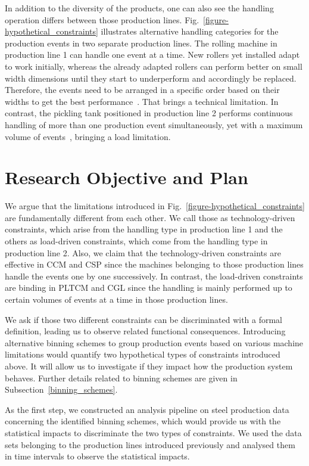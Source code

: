 In addition to the diversity of the products, one can also see the handling operation differs between those production lines. Fig.~\ref{figure-hypothetical_constraints} illustrates alternative handling categories for the production events in two separate production lines. The rolling machine in production line 1 can handle one event at a time. New rollers yet installed adapt to work initially, whereas the already adapted rollers can perform better on small width dimensions until they start to underperform and accordingly be replaced. Therefore, the events need to be arranged in a specific order based on their widths to get the best performance~\cite{OZGUR2021106606}. That brings a technical limitation. In contrast, the pickling tank positioned in production line 2 performs continuous handling of more than one production event simultaneously, yet with a maximum volume of events~\cite{takase2011strength}, bringing a load limitation.

\section{Research Objective and Plan}

We argue that the limitations introduced in Fig.~\ref{figure-hypothetical_constraints} are fundamentally different from each other. We call those as technology-driven constraints, which arise from the handling type in production line 1 and the others as load-driven constraints, which come from the handling type in production line 2. Also, we claim that the technology-driven constraints are effective in CCM and CSP since the machines belonging to those production lines handle the events one by one successively. In contrast, the load-driven constraints are binding in PLTCM and CGL since the handling is mainly performed up to certain volumes of events at a time in those production lines.

We ask if those two different constraints can be discriminated with a formal definition, leading us to observe related functional consequences. Introducing alternative binning schemes to group production events based on various machine limitations would quantify two hypothetical types of constraints introduced above. It will allow us to investigate if they impact how the production system behaves. Further details related to binning schemes are given in Subsection~\ref{binning_schemes}.

As the first step, we constructed an analysis pipeline on steel production data concerning the identified binning schemes, which would provide us with the statistical impacts to discriminate the two types of constraints. We used the data sets belonging to the production lines introduced previously and analysed them in time intervals to observe the statistical impacts. 


